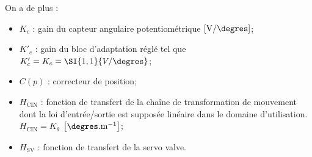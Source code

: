 On a de plus :
\begin{itemize}
\item $K_c$ : gain du capteur angulaire potentiométrique $\left[\text{V}/\degres\right]$;
\item $K'_c$ : gain du bloc d'adaptation réglé tel que $K'_c=K_c=\SI{1,1}{V/\degres}$;
\item $C(p)$ : correcteur de position;
\item $H_{\text{CIN}}$ : fonction de transfert de la chaîne de transformation de mouvement dont la loi
d’entrée/sortie est supposée linéaire dans le domaine d’utilisation. $H_{\text{CIN}}=K_{\theta}$ $\left[\degres.\text{m}^{-1}\right]$;
\item $H_{\text{SV}}$ : fonction de transfert de la servo valve.
\end{itemize}

\fi

